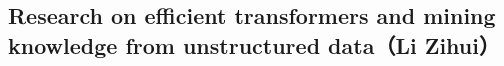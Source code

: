\subsection{Research on efficient transformers and mining knowledge from unstructured data（Li Zihui）}



